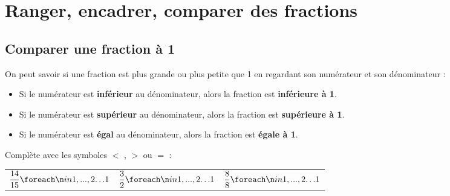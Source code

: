\documentclass[a4paper]{book}
\begin{document}
\begin{exemple}
\begin{center}
        \end{center}
    \end{exemple}

    
\section{Ranger, encadrer, comparer des fractions}
\subsection{Comparer une fraction à 1}
    
    \begin{propriete}
        On peut savoir si une fraction est plus grande ou plus petite que 1 en regardant son numérateur et son dénominateur :
        \begin{itemize}
            \item Si le numérateur est \textbf{inférieur} au dénominateur, alors la fraction est \textbf{inférieure à 1}.
            \item Si le numérateur est \textbf{supérieur} au dénominateur, alors la fraction est \textbf{supérieure à 1}.
            \item Si le numérateur est \textbf{égal} au dénominateur, alors la fraction est \textbf{égale à 1}.
        \end{itemize}
    \end{propriete}
    
    \begin{exemple}
    Complète avec les symboles $<$ , $>$ ou $=$ :
    \begin{center}
        \renewcommand{\arraystretch}{2}
        \begin{tabularx}{0.8\textwidth}{XXX}
            $\dfrac{14}{15} \points[2] 1$ & $\dfrac{3}{2} \points[2] 1$ & $\dfrac{8}{8} \points[2] 1$ \\
        \end{tabularx}
    \end{center}
    \end{exemple}
\end{document}
